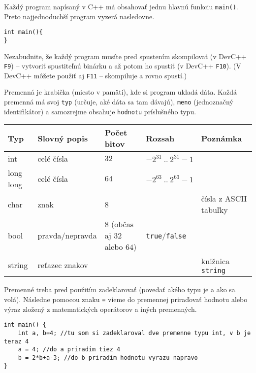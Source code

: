 




Každý program napísaný v C++ má obsahovať jednu hlavnú funkciu \texttt{main()}. Preto najjednoduchší
program vyzerá nasledovne.

\begin{lstlisting}
int main(){
}
\end{lstlisting}

Nezabudnite, že každý program musíte pred spustením skompilovať (v DevC++ \texttt{F9}) -- vytvoriť
spustiteľnú binárku a až potom ho spustiť (v DevC++ \texttt{F10}). (V DevC++ môžete použiť aj
\texttt{F11} -- skompiluje a rovno spustí.)


Premenná je krabička (miesto v pamäti), kde si program ukladá dáta. Každá premenná má svoj
\texttt{typ} (určuje, aké dáta sa tam dávajú), \texttt{meno} (jednoznačný identifikátor) a
samozrejme obsahuje \texttt{hodnotu} príslušného typu.

\begin{tabular}{|l|l|l|l|l|}
\hline
Typ & Slovný popis & Počet bitov & Rozsah & Poznámka \\ \hline
int & celé čísla & $32$ & $-2^{31}\ ..\ 2^{31}-1$ &  \\ \hline
long long & celé čísla & $64$ & $-2^{63}\ ..\ 2^{63}-1$ &  \\ \hline
char & znak & 8 & & čísla z ASCII tabuľky \\ \hline
bool & pravda/nepravda & $8$ (občas aj $32$ alebo $64$) & \texttt{true}/\texttt{false} & \\ \hline
string & reťazec znakov & & & knižnica \texttt{string} \\ \hline
\end{tabular}

Premenné treba pred použitím zadeklarovať (povedať akého typu je a ako sa volá). Následne pomocou
znaku \texttt{=} vieme do premennej priraďovať hodnotu alebo výraz zložený z matematických
operátorov a iných premenných.

\begin{lstlisting}
int main() {
    int a, b=4; //tu som si zadeklaroval dve premenne typu int, v b je teraz 4
    a = 4; //do a priradim tiez 4
    b = 2*b+a-3; //do b priradim hodnotu vyrazu napravo
}
\end{lstlisting}

